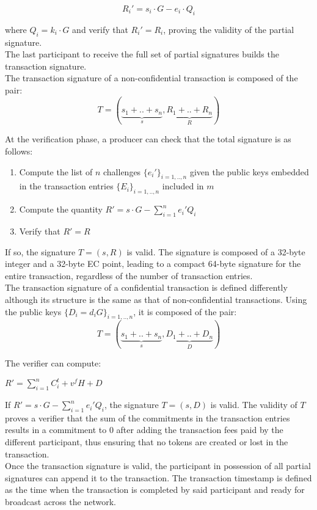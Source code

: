 \begin{equation} 
R_i' = s_{i}\cdot G - e_i\cdot Q_i
\end{equation}

where $Q_i = k_i\cdot G$ and verify that $R_i' = R_i$, proving the validity of the partial signature. \\

The last participant to receive the full set of partial signatures builds the transaction signature.\\

 The transaction signature of a non-confidential transaction is composed of the pair:
\begin{equation} 
T= (\underbrace{s_{1}+..+s_{n}}_{s}, \underbrace{R_{1}+..+R_{n}}_{R})
\end{equation}

At the verification phase, a producer can check that the total signature is as follows:
\begin{enumerate}
\item Compute the list of $n$ challenges $\{e_i'\}_{i=1,..,n}$ given the public keys embedded in the transaction entries $\{E_i\}_{i=1,..,n}$ included in $m$
\item Compute the quantity $R' = s \cdot G - \sum_{i=1}^{n}e_i'Q_i$
\item Verify that $R'=R$
\end{enumerate}

If so, the signature $T = (s,R)$ is valid. The signature is composed of a 32-byte integer and a 32-byte EC point, leading to a compact 64-byte signature for the entire transaction, regardless of the number of transaction entries. \\

The transaction signature of a confidential transaction is defined differently although its structure is the same as that of non-confidential transactions. Using the public keys $\{D_i = d_iG\}_{i=1,..,n}$, it is composed of the pair:
\begin{equation} 
T= (\underbrace{s_{1}+..+s_{n}}_{s}, \underbrace{D_{1}+..+D_{n}}_{D})
\end{equation}

The verifier can compute:
\begin{center}
$R' = \sum_{i=1}^{n}C_i^t + v^fH + D$
\end{center}

If $R' = s \cdot G - \sum_{i=1}^{n}e_i'Q_i$, the signature $T = (s,D)$ is valid. The validity of $T$ proves a verifier that the sum of the commitments in the transaction entries results in a commitment to 0 after adding the transaction fees paid by the different participant, thus ensuring that no tokens are created or lost in the transaction. \\

Once the transaction signature is valid, the participant in possession of all partial signatures can append it to the transaction. The transaction timestamp is defined as the time when the transaction is completed by said participant and ready for broadcast across the network. 
